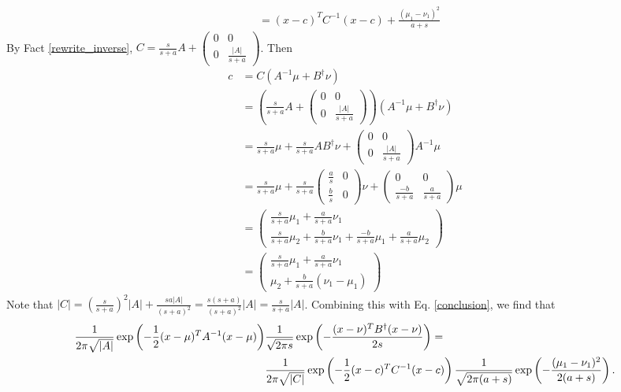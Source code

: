 \documentclass{article}
\begin{document}
\begin{pf}
\begin{align}
\\&=(x-c)^TC^{-1}(x-c)+\frac{(\mu_1-\nu_1)^2}{a+s} \label{conclusion}
\end{align}
By Fact \ref{rewrite_inverse}, $C=\frac{s}{s+a}A+\left(\begin{array}{cc}0 & 0 \\ 0 & \frac{|A|}{s+a} \end{array}\right)$. Then
\begin{align*}
c&=C(A^{-1}\mu+B^\dagger\nu)
\\&=\left(\frac{s}{s+a}A+\left(\begin{array}{cc}0 & 0 \\ 0 & \frac{|A|}{s+a} \end{array}\right)\right)(A^{-1}\mu+B^\dagger\nu)
\\&=\frac{s}{s+a}\mu+\frac{s}{s+a}AB^\dagger\nu+\left(\begin{array}{cc}0 & 0 \\ 0 & \frac{|A|}{s+a} \end{array}\right)A^{-1}\mu
\\&=\frac{s}{s+a}\mu+\frac{s}{s+a}\left(\begin{array}{cc}\frac{a}{s} & 0 \\ \frac{b}{s} & 0 \end{array}\right)\nu+\left(\begin{array}{cc}0 & 0 \\ \frac{-b}{s+a} & \frac{a}{s+a} \end{array}\right)\mu
\\&=\left(\begin{array}{c}\frac{s}{s+a}\mu_1+\frac{a}{s+a}\nu_1 
\\\frac{s}{s+a}\mu_2+\frac{b}{s+a}\nu_1+\frac{-b}{s+a}\mu_1+\frac{a}{s+a}\mu_2
\end{array}\right)
\\&=\left(\begin{array}{c}\frac{s}{s+a}\mu_1+\frac{a}{s+a}\nu_1 
\\\mu_2+\frac{b}{s+a}(\nu_1-\mu_1)
\end{array}\right)
\end{align*}
Note that $|C|=(\frac{s}{s+a})^2|A|+\frac{sa|A|}{(s+a)^2}=\frac{s(s+a)}{(s+a)^2}|A|=\frac{s}{s+a}|A|$. Combining this with Eq. \ref{conclusion}, we find that  
\begin{align*}
\frac{1}{2\pi\sqrt{|A|}}\exp\left(-\frac{1}{2}(x-\mu)^TA^{-1}(x-\mu)\right)&\frac{1}{\sqrt{2\pi s}}\exp\left(-\frac{(x-\nu)^TB^\dagger(x-\nu)}{2s}\right)= \notag
\\&\frac{1}{2\pi\sqrt{|C|}}\exp\left(-\frac{1}{2}(x-c)^TC^{-1}(x-c)\right)\frac{1}{\sqrt{2\pi(a+s)}}\exp\left(-\frac{(\mu_1-\nu_1)^2}{2(a+s)}\right).
\end{align*}
\end{pf}
\end{document}
